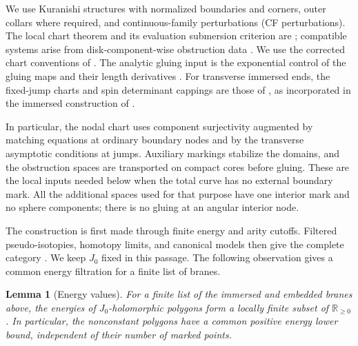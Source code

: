 \documentclass[11pt]{article}
\numberwithin{equation}{section}
\newtheorem{lemma}[theorem]{Lemma}
\theoremstyle{definition}
\theoremstyle{remark}
\begin{document}
We use Kuranishi structures with normalized boundaries and corners,
outer collars where required, and continuous-family perturbations
(CF perturbations).  The local chart theorem and its evaluation
submersion criterion are
\cite[Theorem~7.1, Condition~7.11, and Lemma~7.12]{FOOOChartsI};
compatible systems arise from disk-component-wise obstruction data
\cite[Theorems~5.3 and~5.4]{FOOOChartsII}.  We use the corrected chart
conventions of \cite{FOOOChartsICorrigendum}.
The analytic gluing input is the exponential control of the gluing
maps and their length derivatives
\cite[Assumption~3.12 and Theorems~3.13, 6.4, 8.16, and~8.17]{FOOOGluing}.
For transverse immersed ends, the fixed-jump charts and spin
determinant cappings are those of
\cite[Sections~4--5]{AkahoJoyce}, as incorporated in the immersed
construction of \cite{AFOOO2026}.

In particular, the nodal chart uses component surjectivity augmented
by matching equations at ordinary boundary nodes and by the transverse
asymptotic conditions at jumps.  Auxiliary markings stabilize the
domains, and the obstruction spaces are transported on compact cores
before gluing.  These are the local inputs needed below when the total
curve has no external boundary mark.  All the additional spaces used
for that purpose have one interior mark and no sphere
components; there is no gluing at an angular interior node.

The construction is first made through finite energy and arity
cutoffs.  Filtered pseudo-isotopies, homotopy limits, and canonical
models then give the complete category
\cite[Sections~6, 9--10, and~12, in particular Propositions~9.55
and~12.10]{AFOOO2026}.  We keep $J_0$ fixed in this passage.  The
following observation gives a common energy filtration for a finite
list of branes.

\begin{lemma}[Energy values]\label{curv:energy}
For a finite list of the immersed and embedded branes above, the
energies of $J_0$-holomorphic polygons form a locally finite subset of
$\mathbb R_{\geq0}$.  In particular, the nonconstant polygons have a common
positive energy lower bound, independent of their number of marked
points.
\end{lemma}
\end{document}
